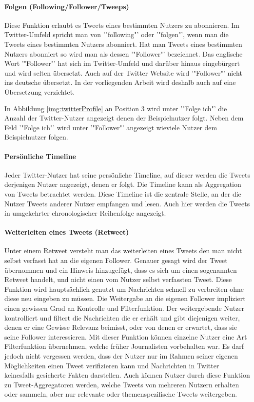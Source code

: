 				\paragraph{Folgen (Following/Follower/Tweeps)}
					Diese Funktion erlaubt es Tweets eines bestimmten Nutzers zu abonnieren. 
					Im Twitter-Umfeld spricht man von '"following"' oder '"folgen"', wenn man die Tweets eines bestimmten Nutzers abonniert.
					Hat man Tweets eines bestimmten Nutzers abonniert so wird man als dessen '"Follower"' bezeichnet. 
					Das englische Wort '"Follower"' hat sich im Twitter-Umfeld und darüber hinaus eingebürgert und wird selten übersetzt. 
					Auch auf der Twitter Website wird '"Follower"' nicht ins deutsche übersetzt.
					In der vorliegenden Arbeit wird deshalb auch auf eine Übersetzung verzichtet. 

					In Abbildung \ref{img:twitterProfile} an Position 3 wird unter '"Folge ich"' die Anzahl der Twitter-Nutzer angezeigt denen der Beispielnutzer folgt. 
					Neben dem Feld '"Folge ich"' wird unter '"Follower"' angezeigt wieviele Nutzer dem Beispielnutzer folgen.

				\paragraph{Persönliche Timeline}
					Jeder Twitter-Nutzer hat seine persönliche Timeline, auf dieser werden die Tweets derjenigen Nutzer angezeigt, denen er folgt. 
					Die Timeline kann als Aggregation von Tweets betrachtet werden.
					Diese Timeline ist die zentrale Stelle, an der die Nutzer Tweets anderer Nutzer empfangen und lesen.
					Auch hier werden die Tweets in umgekehrter chronologischer Reihenfolge angezeigt.  

				\paragraph{Weiterleiten eines Tweets (Retweet)}
					Unter einem Retweet versteht man das weiterleiten eines Tweets den man nicht selbst verfasst hat an die eigenen Follower.
					Genauer gesagt wird der Tweet übernommen und ein Hinweis hinzugefügt, dass es sich um einen sogenannten Retweet handelt, und nicht einen vom Nutzer selbst verfassten Tweet.
					Diese Funktion wird hauptsächlich genutzt um Nachrichten schnell zu verbreiten ohne diese neu eingeben zu müssen. 
					Die Weitergabe an die eigenen Follower impliziert einen gewissen Grad an Kontrolle und Filterfunktion. 
					Der weitergebende Nutzer kontrolliert und filtert die Nachrichten die er erhält und gibt diejenigen weiter, denen er eine Gewisse Relevanz beimisst, oder von denen er erwartet, dass sie seine Follower interessieren. 
					Mit dieser Funktion können einzelne Nutzer eine Art Filterfunktion übernehmen, welche früher Journalisten vorbehalten war. 
					Es darf jedoch nicht vergessen werden, dass der Nutzer nur im Rahmen seiner eigenen Möglichkeiten einen Tweet verifizieren kann und Nachrichten in Twitter keinesfalls gesicherte Fakten darstellen.
					Auch können Nutzer durch diese Funktion zu Tweet-Aggregatoren werden, welche Tweets von mehreren Nutzern erhalten oder sammeln, aber nur relevante oder themenspezifische Tweets weitergeben.

